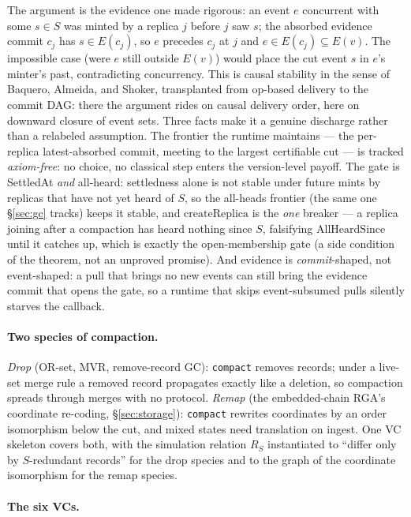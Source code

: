 \documentclass[11pt]{article}
\newcommand{\code}[1]{\texttt{#1}}
\begin{document}
The
argument is the evidence one made rigorous: an event $e$ concurrent with
some $s \in S$ was minted by a replica $j$ before $j$ saw $s$; the
absorbed evidence commit $c_j$ has $s \in E(c_j)$, so $e$ precedes $c_j$
at $j$ and $e \in E(c_j) \subseteq E(v)$. The impossible case (were $e$
still outside $E(v)$) would place the cut event $s$ in $e$'s minter's
past, contradicting concurrency. This is causal stability in the sense
of Baquero, Almeida, and Shoker, transplanted from op-based delivery to
the commit DAG: there the argument rides on causal delivery order, here
on downward closure of event sets. Three facts make it a genuine
discharge rather than a relabeled assumption. The frontier the runtime
maintains --- the per-replica latest-absorbed commit, meeting to the
largest certifiable cut --- is tracked \emph{axiom-free}: no choice, no
classical step enters the version-level payoff. The gate is SettledAt
\emph{and} all-heard: settledness alone is not stable under future mints
by replicas that have not yet heard of $S$, so the all-heads frontier
(the same one \S\ref{sec:gc} tracks) keeps it stable, and
$\mathrm{createReplica}$ is the \emph{one} breaker --- a replica joining
after a compaction has heard nothing since $S$, falsifying
$\mathrm{AllHeardSince}$ until it catches up, which is exactly the
open-membership gate (a side condition of the theorem, not an unproved
promise). And evidence is \emph{commit}-shaped, not event-shaped: a pull
that brings no new events can still bring the evidence commit that opens
the gate, so a runtime that skips event-subsumed pulls silently starves
the callback.

\paragraph{Two species of compaction.} \emph{Drop} (OR-set, MVR,
remove-record GC): \code{compact} removes records; under a live-set
merge rule a removed record propagates exactly like a deletion, so
compaction spreads through merges with no protocol. \emph{Remap} (the
embedded-chain RGA's coordinate re-coding, \S\ref{sec:storage}):
\code{compact} rewrites coordinates by an order isomorphism below the
cut, and mixed states need translation on ingest. One VC skeleton
covers both, with the simulation relation $R_S$ instantiated to
``differ only by $S$-redundant records'' for the drop species and to
the graph of the coordinate isomorphism for the remap species.

\paragraph{The six VCs.}
\end{document}
